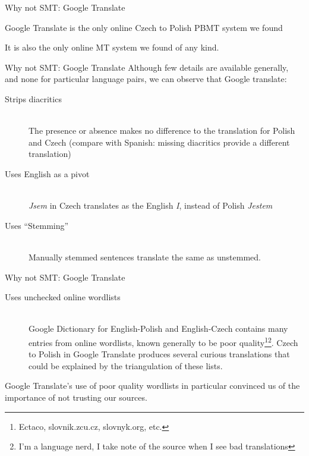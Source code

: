 \documentclass{beamer}
\begin{document}
\begin{frame}{Why not SMT: Google Translate}

Google Translate is the only online Czech to Polish PBMT system we found

It is also the only online MT system we found of any kind.

\end{frame}
\begin{frame}{Why not SMT: Google Translate}
Although few details are available generally, and none for particular language
pairs, we can observe that Google translate:

\begin{description}
  \item[Strips diacritics] \hfill \\
  The presence or absence makes no difference to the translation for Polish and Czech
  (compare with Spanish: missing diacritics provide a different translation)
  \item[Uses English as a pivot] \hfill \\
  {\it Jsem} in Czech translates as the English {\it I}, instead of Polish {\it Jestem}
  \item[Uses ``Stemming''] \hfill \\
  Manually stemmed sentences translate the same as unstemmed.
\end{description}
\end{frame}

\begin{frame}{Why not SMT: Google Translate}
\begin{description}
  \item[Uses unchecked online wordlists] \hfill \\
  Google Dictionary for English-Polish and English-Czech contains many entries from
  online wordlists, known generally to be poor quality\footnote{Ectaco, 
  slovnik.zcu.cz, slovnyk.org, etc.}\footnote{I'm a language nerd, I take note 
  of the source when I see bad translations}. Czech to Polish in Google
  Translate produces several curious translations that could be explained by the
  triangulation of these lists.
\end{description}

Google Translate's use of poor quality wordlists in particular convinced us 
of the importance of not trusting our sources.
\end{frame}
\end{document}
